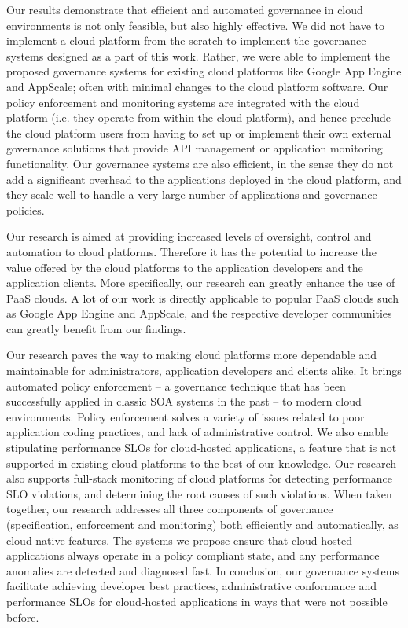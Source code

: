 Our results demonstrate that efficient and automated governance in cloud environments
is not only feasible, but also highly effective. We did not have to implement a cloud platform from the 
scratch to implement the governance systems designed as a part of this work. Rather,
we were able to implement the proposed governance systems for existing cloud platforms
like Google App Engine and AppScale; often with minimal changes to the cloud platform
software. Our policy enforcement and monitoring systems are integrated with the cloud platform 
(i.e. they operate from within the cloud platform), and hence preclude 
the cloud platform users from having to set up or
implement their own external governance solutions that provide API management or
application monitoring functionality. Our governance systems are also efficient, in the 
sense they do not add a significant overhead to the applications deployed in the cloud
platform, and they scale well to handle a very large number of applications and governance
policies.

Our research is aimed at providing increased levels of oversight, control and automation
to cloud platforms. Therefore it has the potential
to increase the value offered by the cloud platforms to the application developers
and the application clients. More specifically, our research can greatly enhance the
use of PaaS clouds. A lot of our work is directly applicable to popular PaaS clouds
such as Google App Engine and AppScale, and the respective developer communities
can greatly benefit from our findings.

Our research paves the way to making cloud platforms more dependable and 
maintainable for administrators, application developers and clients alike. It brings
automated policy enforcement -- a governance technique that has been successfully applied
in classic SOA systems in the past -- to modern cloud environments. Policy enforcement
solves a variety of issues related to poor application coding practices, and lack
of administrative control. We also enable stipulating performance SLOs for
cloud-hosted applications, a feature that is not supported in existing cloud platforms
to the best of our knowledge. Our research also supports full-stack monitoring of cloud
platforms for detecting performance SLO violations, and determining the root causes
of such violations. When taken together, our research addresses all three
components of governance (specification, enforcement and monitoring) both 
efficiently and automatically, as cloud-native features. The systems we propose
ensure that cloud-hosted applications always operate in a policy compliant state,
and any performance anomalies are detected and diagnosed fast.
In conclusion, our governance systems facilitate achieving developer best practices, 
administrative conformance and performance SLOs for cloud-hosted applications in ways
that were not possible before.